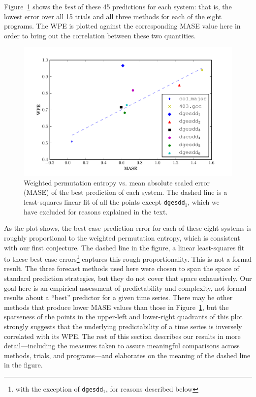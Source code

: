 Figure~\ref{fig:wpe_vs_mase_best} shows the \emph{best} of these 45
predictions for each system: that is, the lowest error over all 15
trials and all three methods for each of the eight programs.  The WPE
is plotted against the corresponding MASE value here in order to bring
out the correlation between these two quantities.
\begin{figure}[htbp]
  \centering
  \includegraphics[width=\columnwidth]{figs/prediction_vs_entropy}
  \caption{Weighted permutation entropy vs. mean absolute scaled error
    (MASE) of the best prediction of each system.
% 
% 
The dashed line is a least-squares linear fit of all the points except
{\tt dgesdd$_1$}, which we have excluded for reasons explained in the
text.}
  \label{fig:wpe_vs_mase_best}
\end{figure}
As the plot shows, the best-case prediction error for each of these
eight systems is roughly proportional to the weighted permutation
entropy, which is consistent with our first conjecture.  The dashed
line in the figure, a linear least-squares fit to these best-case
errors\footnote{with the exception of {\tt dgesdd$_1$}, for reasons
  described below} captures this rough proportionality.  This is not a
formal result.  The three forecast methods used here were chosen to
span the space of standard prediction strategies, but they do not
cover that space exhaustively.  Our goal here is an empirical
assessment of predictability and complexity, not formal results about
a ``best'' predictor for a given time series.  There may be other
methods that produce lower MASE values than those in
Figure~\ref{fig:wpe_vs_mase_best}, but the sparseness of the points in
the upper-left and lower-right quadrants of this plot strongly
suggests that the underlying predictability of a time series is
inversely correlated with its WPE.  The rest of this section describes
our results in more detail---including the measures taken to assure
meaningful comparisons across methods, trials, and programs---and
elaborates on the meaning of the dashed line in the figure.

